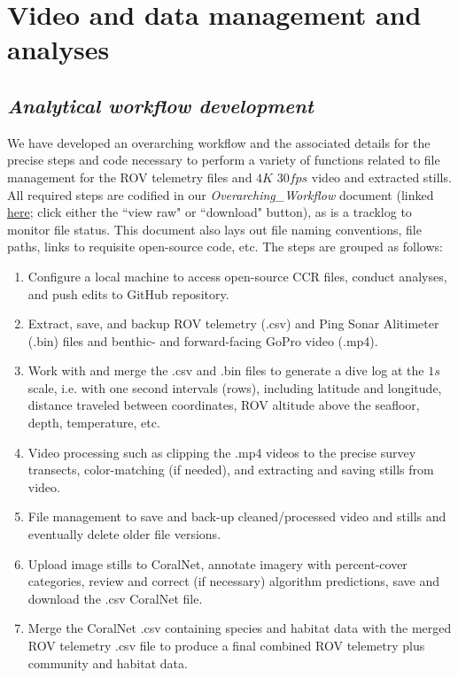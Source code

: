 \documentclass[11pt]{article}
\begin{document}
\section{Video and data management and analyses}
\label{Analyses}

\subsection{\textit{Analytical workflow development}}
We have developed an overarching workflow and the associated details for the precise steps and code necessary to perform a 
variety of functions related to file management for the ROV telemetry 
files and $4K$ $30fps$ video and extracted stills. 
All required steps are codified in our \textit{Overarching\_Workflow} 
document (linked \href{https://github.com/zhrandell/Seattle_Aquarium_ROV_telemetry_imagery_analysis/blob/main/documents/Overarching_Workflow.xlsx}{here}; click either the ``view raw" or ``download" button),
 as is a tracklog to monitor file status. 
This document also lays out file naming conventions, file paths, links to requisite open-source code, etc. 
The steps are grouped as follows:

\begin{enumerate}[label=\textbf{\Alph*}:]
\item 
Configure a local machine to access open-source CCR 
files, conduct analyses, and push edits to GitHub repository.
\item 
Extract, save, and backup ROV telemetry (.csv) and Ping Sonar 
Alitimeter (.bin) files and benthic- and forward-facing GoPro video 
(.mp4). 
\item
Work with and merge the .csv and .bin files to 
generate a dive log at the $1s$ scale, i.e. with one second intervals 
(rows), including latitude and longitude, distance traveled between 
coordinates, ROV altitude above the seafloor, depth, temperature, etc.
\item
Video processing such as clipping the .mp4 videos to the precise survey
transects, color-matching (if needed), and extracting and saving stills 
from video.
\item 
File management to save and back-up cleaned/processed video and stills 
and eventually delete older file versions. 
\item Upload image stills to CoralNet, annotate imagery 
with percent-cover categories, review and correct (if necessary) 
algorithm predictions, save and download the .csv CoralNet file.
 \item 
Merge the CoralNet .csv containing species and habitat data 
with the merged ROV telemetry .csv file to produce a final combined ROV 
telemetry plus community and habitat data. 
\end{enumerate}
\end{document}
